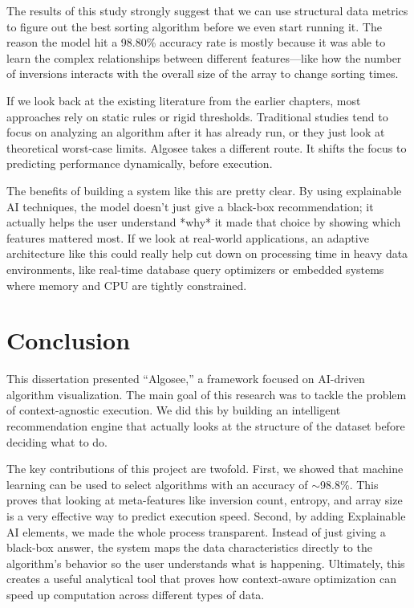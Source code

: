\documentclass[12pt,a4paper,oneside,openany]{report}
\begin{document}
The results of this study strongly suggest that we can use structural data metrics to figure out the best sorting algorithm before we even start running it. The reason the model hit a 98.80\% accuracy rate is mostly because it was able to learn the complex relationships between different features---like how the number of inversions interacts with the overall size of the array to change sorting times.

If we look back at the existing literature from the earlier chapters, most approaches rely on static rules or rigid thresholds. Traditional studies tend to focus on analyzing an algorithm after it has already run, or they just look at theoretical worst-case limits. Algosee takes a different route. It shifts the focus to predicting performance dynamically, before execution.

The benefits of building a system like this are pretty clear. By using explainable AI techniques, the model doesn't just give a black-box recommendation; it actually helps the user understand *why* it made that choice by showing which features mattered most. If we look at real-world applications, an adaptive architecture like this could really help cut down on processing time in heavy data environments, like real-time database query optimizers or embedded systems where memory and CPU are tightly constrained.

\chapter{Conclusion}
This dissertation presented ``Algosee,'' a framework focused on AI-driven algorithm visualization. The main goal of this research was to tackle the problem of context-agnostic execution. We did this by building an intelligent recommendation engine that actually looks at the structure of the dataset before deciding what to do.

The key contributions of this project are twofold. First, we showed that machine learning can be used to select algorithms with an accuracy of $\sim$98.8\%. This proves that looking at meta-features like inversion count, entropy, and array size is a very effective way to predict execution speed. Second, by adding Explainable AI elements, we made the whole process transparent. Instead of just giving a black-box answer, the system maps the data characteristics directly to the algorithm's behavior so the user understands what is happening. Ultimately, this creates a useful analytical tool that proves how context-aware optimization can speed up computation across different types of data.
\end{document}
